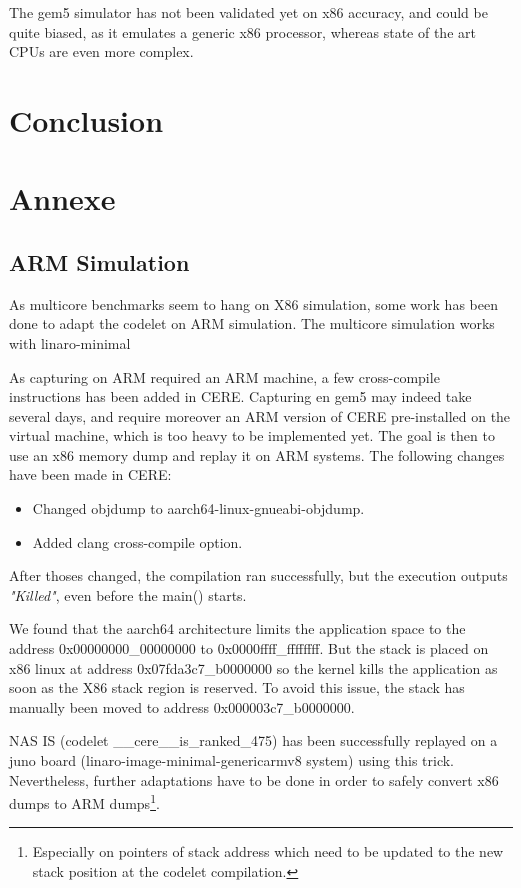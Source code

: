 \documentclass{article}
\begin{document}
\begin{multicols}{2}
The gem5 simulator has not been validated yet on x86 accuracy, and could be quite biased, as it emulates a generic x86 processor, whereas state of the art CPUs are even more complex.


\section{Conclusion}
\label{ccl}

\newpage





\newpage
\section{Annexe}
\subsection{ARM Simulation}
\label{ARM_sim}
As multicore benchmarks seem to hang on X86 simulation, some work has been done to adapt the codelet on ARM simulation.
The multicore simulation works with linaro-minimal

As capturing on ARM required an ARM machine, a few cross-compile instructions has been added in CERE. Capturing en gem5 may indeed take several days, and require moreover an ARM version of CERE pre-installed on the virtual machine, which is too heavy to be implemented yet. The goal is then to use an x86 memory dump and replay it on ARM systems. The following changes have been made in CERE:
\begin{itemize}
\item Changed objdump to aarch64-linux-gnueabi-objdump.
\item Added clang cross-compile option.
\end{itemize}

After thoses changed, the compilation ran successfully, but the execution outputs \textit{"Killed"}, even before the main() starts.


We found that the aarch64 architecture limits the application space to the address 0x00000000\_00000000 to 0x0000ffff\_ffffffff\cite{aarch64-mmu}.
 But the stack is placed on x86 linux at address 0x07fda3c7\_b0000000 so the kernel kills the application as soon as the X86 stack region is reserved.
To avoid this issue, the stack has manually been moved to address 0x000003c7\_b0000000.

NAS IS (codelet \_\_cere\_\_is\_ranked\_475) has been successfully replayed on a juno board (linaro-image-minimal-genericarmv8 system) using this trick. Nevertheless, further adaptations have to be done in order to safely convert x86 dumps to ARM dumps\footnote{Especially on pointers of stack address which need to be updated to the new stack position at the codelet compilation.}.



\end{multicols}
\end{document}
